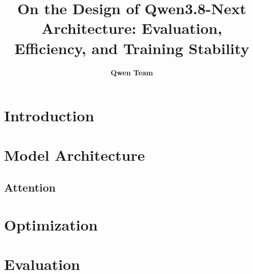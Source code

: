 \documentclass{article} %
\author{\textbf{Qwen Team}
}
\title{
On the Design of Qwen3.8-Next Architecture:
Evaluation, Efficiency, and Training Stability
}
\begin{document}
\maketitle

\begin{abstract}

\end{abstract}

\section{Introduction}





\section{Model Architecture}

\subsection{Attention}









\section{Optimization}








\section{Evaluation}


















\end{document}
